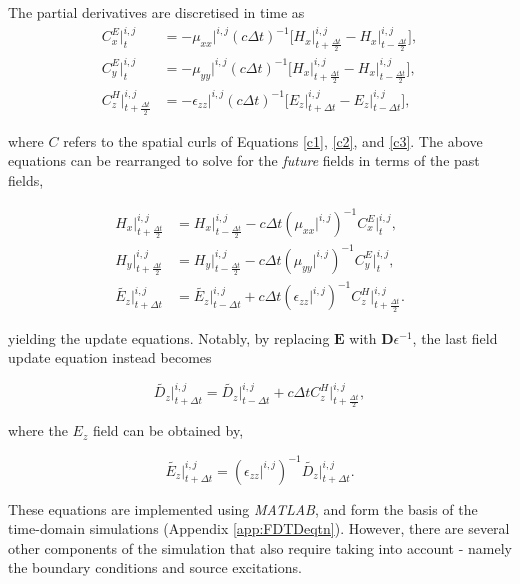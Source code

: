 The partial derivatives are discretised in time as 
\begin{align}
C_x^E\rvert^{i,j}_t &= -\mu_{xx}\rvert^{i,j} (c \Delta t)^{-1} \Big[H_x \rvert_{t+\frac{\Delta t}{2}}^{i,j} - H_x \rvert_{t-\frac{\Delta t}{2}}^{i,j}\Big], \\
C_y^E\rvert^{i,j}_t &= -\mu_{yy} \rvert^{i,j} (c \Delta t)^{-1} \Big[H_x \rvert_{t+\frac{\Delta t}{2}}^{i,j} - H_x \rvert_{t-\frac{\Delta t}{2}}^{i,j}\Big], \\
C_z^H\rvert^{i,j}_{t+\frac{\Delta t}{2}} &= -\epsilon_{zz} \rvert^{i,j} (c \Delta t)^{-1} \Big[E_z \rvert_{t + \Delta t}^{i,j} - E_z \rvert_{t-\Delta t}^{i,j}\Big],
\end{align}

where $C$ refers to the spatial curls of Equations \ref{c1}, \ref{c2}, and \ref{c3}. The above equations can be rearranged to solve for the \textit{future} fields in terms of the past fields,

\begin{align}
H_x \rvert_{t+\frac{\Delta t}{2}}^{i,j} &= H_x \rvert_{t-\frac{\Delta t}{2}}^{i,j} - c \Delta t (\mu_{xx}\rvert^{i,j})^{-1} C_x^E \rvert_t^{i,j}, \\
H_y \rvert_{t+\frac{\Delta t}{2}}^{i,j} &= H_y \rvert_{t-\frac{\Delta t}{2}}^{i,j} - c \Delta t (\mu_{yy}\rvert^{i,j})^{-1} C_y^E \rvert_t^{i,j}, \\
\tilde{E_z} \rvert_{t+\Delta t}^{i,j} &= \tilde{E_z} \rvert_{t-\Delta t}^{i,j} + c \Delta t (\epsilon_{zz} \rvert^{i,j})^{-1} C_z^H \rvert_{t+\frac{\Delta t}{2}}^{i,j}.
\label{eqn:fdtd}
\end{align}

yielding the update equations. Notably, by replacing $\bm{E}$ with $\bm{D} \epsilon^{-1}$, the last field update equation instead becomes

\begin{equation}
\tilde{D_z} \rvert_{t+\Delta t}^{i,j} = \tilde{D_z} \rvert_{t-\Delta t}^{i,j} + c \Delta t  C_z^H \rvert_{t+\frac{\Delta t}{2}}^{i,j},
\end{equation}

where the $E_z$ field can be obtained by,

\begin{equation}
\tilde{E_z} \rvert_{t+\Delta t}^{i,j} =  (\epsilon_{zz} \rvert^{i,j})^{-1} \tilde{D_z} \rvert_{t+\Delta t}^{i,j}.
\end{equation}

These equations are implemented using \textit{MATLAB}, and form the basis of the time-domain simulations (Appendix \ref{app:FDTDeqtn}). However, there are several other components of the simulation that also require taking into account - namely the boundary conditions and source excitations.

